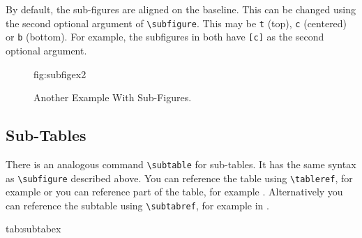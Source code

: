 \documentclass[pmlr]{jmlr}
\begin{document}
By default, the sub-figures are aligned on the baseline.
This can be changed using the second optional argument
of \verb|\subfigure|. This may be \texttt{t} (top), \texttt{c}
(centered) or \texttt{b} (bottom). For example, the subfigures
 in 
both have \verb|[c]| as the second optional argument.

\begin{figure}[htbp]
\floatconts
  {fig:subfigex2}
  {\caption{Another Example With Sub-Figures.}}
  {%
    \qquad
  }
\end{figure}

\subsection{Sub-Tables}
\label{sec:subtables}
There is an analogous command \verb|\subtable| for sub-tables.
It has the same syntax as \verb|\subfigure| described above.
You can reference the table using \verb|\tableref|, for example
 or you can reference part of the table,
for example . Alternatively you can reference the
subtable using \verb|\subtabref|, for example
 in .

\begin{table}[htbp]
\floatconts
 {tab:subtabex}
 {\caption{An Example With Sub-Tables}}
 {%
   \qquad
 }
\end{table}
\end{document}

